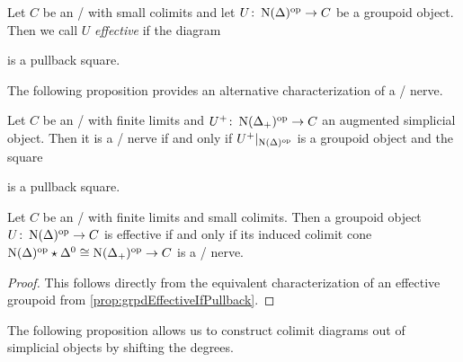 \begin{definition}
    Let $C$ be an \inftycat/ with small colimits and let $U\colon\operatorname{N}(\Delta)^{\operatorname{op}}\to C$ be a groupoid object.
    Then we call $U$ \emph{effective} if the diagram 
    \begin{center} 
    \end{center}
    is a pullback square.
\end{definition}
The following proposition provides an alternative characterization of a \Cech/ nerve.
\begin{prop}\label{prop:grpdEffectiveIfPullback} 
    Let $C$ be an \inftycat/ with finite limits and $U^+\colon\operatorname{N}(\Delta_+)^{\operatorname{op}}\to C$ an augmented simplicial object.
    Then it is a \Cech/ nerve if and only if $U^+|_{\operatorname{N}(\Delta)^{\operatorname{op}}}$ is a groupoid object and the square
    \begin{center}
    \end{center}
    is a pullback square.
    \begin{reference}
        \cite[Proposition 6.1.2.11]{HTT}
    \end{reference}
\end{prop}
\begin{corollary}\label{cor:groupoidEffectiveIffColimCechNerve}
    Let $C$ be an \inftycat/ with finite limits and small colimits. 
    Then a groupoid object $U\colon\operatorname{N}(\Delta)^{\operatorname{op}}\to C$ is effective if and only if its induced colimit cone $\operatorname{N}(\Delta)^{\operatorname{op}}\star\Delta^0\cong\operatorname{N}(\Delta_+)^{\operatorname{op}}\to C$ is a \Cech/ nerve.
    \begin{proof}
        This follows directly from the equivalent characterization of an effective groupoid from \cref{prop:grpdEffectiveIfPullback}.
    \end{proof}
\end{corollary}
The following proposition allows us to construct colimit diagrams out of simplicial objects by shifting the degrees.
